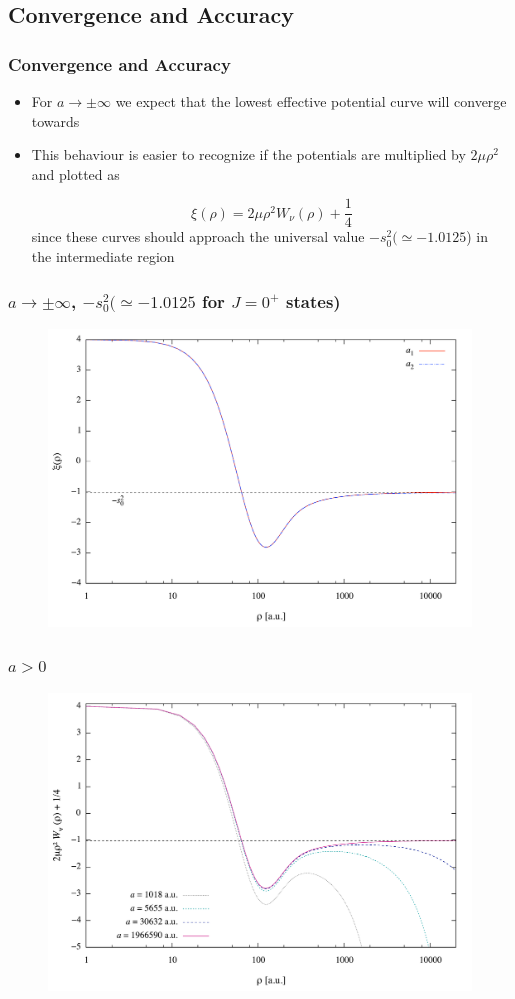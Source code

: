 \documentclass[hideothersubsections]{beamer}
\begin{document}
\subsection{Convergence and Accuracy}
\begin{frame}[label=Results]
\frametitle{Convergence and Accuracy}
\begin{itemize}
	\item<1-> For $a \rightarrow \pm \infty$ we expect that the lowest effective potential curve will converge towards
	\hyperlink{W}{}
	\item This behaviour is easier to recognize if the potentials are multiplied by $2 \mu \rho^2$ and plotted as 
	
	\begin{equation}\label{eq:lambda}
	\xi(\rho) = 2 \mu \rho^2 W_{\nu}(\rho) + \frac{1}{4}
	\end{equation}
	since these curves should approach the universal value $-s_0^2 (\simeq -1.0125$) in the intermediate region
\end{itemize}
\end{frame}


\begin{frame}
\frametitle{$a \rightarrow \pm \infty$, $-s_0^2 (\simeq -1.0125$ for $J=0^+$ states)}
\begin{figure}
	\includegraphics[width=0.8\linewidth]{infty.pdf}
\end{figure}
\end{frame}

\begin{frame}
\frametitle{$a >0$}
\begin{figure}
	\includegraphics[width=0.8\linewidth]{finite_positive_a.pdf}
\end{figure}
\end{frame}
\end{document}
